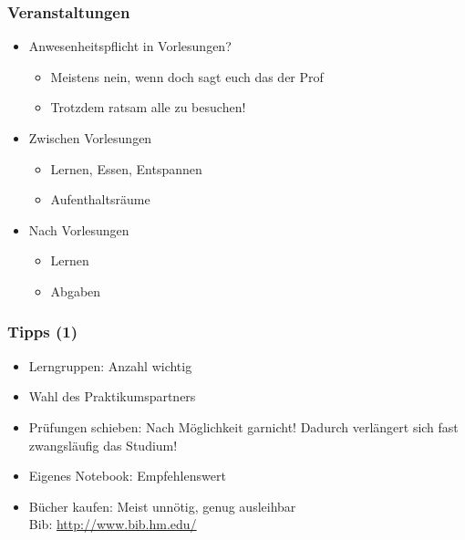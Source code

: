 \documentclass{beamer}
\begin{document}
\begin{frame}
\frametitle{Veranstaltungen}
\begin{itemize}
	\item Anwesenheitspflicht in Vorlesungen?
		\begin{itemize}
			\item Meistens nein, wenn doch sagt euch das der Prof
			\item Trotzdem ratsam alle zu besuchen!
		\end{itemize}
	\pause
	\item Zwischen Vorlesungen
		\begin{itemize}
			\item Lernen, Essen, Entspannen
			\item Aufenthaltsräume
		\end{itemize}
	\pause
	\item Nach Vorlesungen
		\begin{itemize}
			\item Lernen
			\item Abgaben
		\end{itemize}
\end{itemize}
\end{frame}


\begin{frame}
\frametitle{Tipps (1)}
\begin{itemize}
	\item Lerngruppen: Anzahl wichtig
	\pause
	\item Wahl des Praktikumspartners
	\pause
	\item Prüfungen schieben: Nach Möglichkeit garnicht! Dadurch verlängert sich fast zwangsläufig das Studium!
	\pause
	\item Eigenes Notebook: Empfehlenswert
	\pause
	\item Bücher kaufen: Meist unnötig, genug ausleihbar\\
		\footnotesize Bib: \url{http://www.bib.hm.edu/}\small
\end{itemize}
\end{frame}
\end{document}
